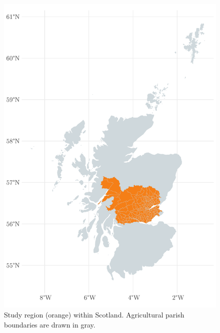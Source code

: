 \begin{figure}
    \centering
    \includegraphics[width=0.5\linewidth]{output/figures/study_area.pdf}
    \caption{Study region (orange) within Scotland. Agricultural parish boundaries are drawn in gray.}
    \label{fig:enter-label}
\end{figure}

